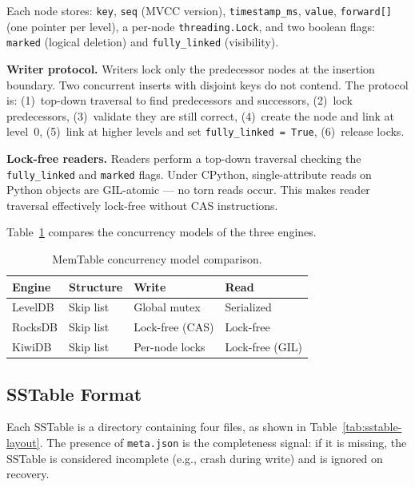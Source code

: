 \documentclass[conference]{IEEEtran}
\begin{document}
Each node stores: \texttt{key}, \texttt{seq} (MVCC version), \texttt{timestamp\_ms}, \texttt{value}, \texttt{forward[]} (one pointer per level), a per-node \texttt{threading.Lock}, and two boolean flags: \texttt{marked} (logical deletion) and \texttt{fully\_linked} (visibility).

\textbf{Writer protocol.} Writers lock only the predecessor nodes at the insertion boundary. Two concurrent inserts with disjoint keys do not contend. The protocol is: (1)~top-down traversal to find predecessors and successors, (2)~lock predecessors, (3)~validate they are still correct, (4)~create the node and link at level~0, (5)~link at higher levels and set \texttt{fully\_linked = True}, (6)~release locks.

\textbf{Lock-free readers.} Readers perform a top-down traversal checking the \texttt{fully\_linked} and \texttt{marked} flags. Under CPython, single-attribute reads on Python objects are GIL-atomic --- no torn reads occur. This makes reader traversal effectively lock-free without CAS instructions.

Table~\ref{tab:skiplist-comparison} compares the concurrency models of the three engines.

\begin{table}[t]
\centering
\caption{MemTable concurrency model comparison.}
\label{tab:skiplist-comparison}
\begin{tabular}{@{}llll@{}}
\toprule
\textbf{Engine} & \textbf{Structure} & \textbf{Write} & \textbf{Read} \\
\midrule
LevelDB & Skip list & Global mutex & Serialized \\
RocksDB & Skip list & Lock-free (CAS) & Lock-free \\
KiwiDB & Skip list & Per-node locks & Lock-free (GIL) \\
\bottomrule
\end{tabular}
\end{table}

\subsection{SSTable Format}

Each SSTable is a directory containing four files, as shown in Table~\ref{tab:sstable-layout}. The presence of \texttt{meta.json} is the completeness signal: if it is missing, the SSTable is considered incomplete (e.g., crash during write) and is ignored on recovery.
\end{document}
